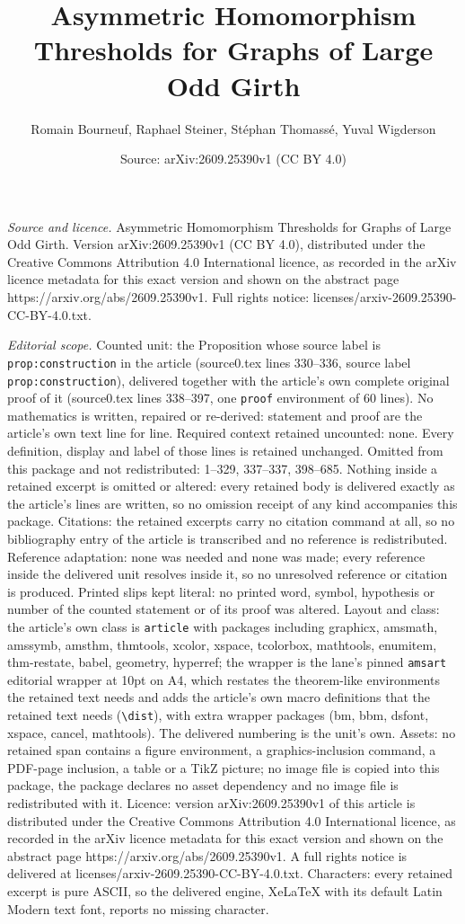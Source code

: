 \documentclass[10pt,a4paper]{amsart}
\title[Asymmetric Homomorphism Thresholds for Graphs of Large Odd G]{Asymmetric Homomorphism Thresholds for Graphs of Large Odd Girth}
\author{Romain Bourneuf, Raphael Steiner, St\'ephan Thomass\'e, Yuval Wigderson}
\date{Source: arXiv:2609.25390v1 (CC BY 4.0)}
\begin{document}
\maketitle

\noindent\emph{Source and licence.} Asymmetric Homomorphism Thresholds for Graphs of Large Odd Girth. Version arXiv:2609.25390v1 (CC BY 4.0), distributed under the Creative Commons Attribution 4.0 International licence, as recorded in the arXiv licence metadata for this exact version and shown on the abstract page https://arxiv.org/abs/2609.25390v1. Full rights notice: licenses/arxiv-2609.25390-CC-BY-4.0.txt.\par\smallskip

\noindent\textit{Editorial scope.} Counted unit: the Proposition whose source label is \texttt{prop:construction} in the article (source0.tex lines 330--336, source label \texttt{prop:construction}), delivered together with the article's own complete original proof of it (source0.tex lines 338--397, one \texttt{proof} environment of 60 lines). No mathematics is written, repaired or re-derived: statement and proof are the article's own text line for line. Required context retained uncounted: none. Every definition, display and label of those lines is retained unchanged. Omitted from this package and not redistributed: 1--329, 337--337, 398--685. Nothing inside a retained excerpt is omitted or altered: every retained body is delivered exactly as the article's lines are written, so no omission receipt of any kind accompanies this package. Citations: the retained excerpts carry no citation command at all, so no bibliography entry of the article is transcribed and no reference is redistributed. Reference adaptation: none was needed and none was made; every reference inside the delivered unit resolves inside it, so no unresolved reference or citation is produced. Printed slips kept literal: no printed word, symbol, hypothesis or number of the counted statement or of its proof was altered. Layout and class: the article's own class is \texttt{article} with packages including graphicx, amsmath, amssymb, amsthm, thmtools, xcolor, xspace, tcolorbox, mathtools, enumitem, thm-restate, babel, geometry, hyperref; the wrapper is the lane's pinned \texttt{amsart} editorial wrapper at 10pt on A4, which restates the theorem-like environments the retained text needs and adds the article's own macro definitions that the retained text needs (\texttt{\textbackslash dist}), with extra wrapper packages (bm, bbm, dsfont, xspace, cancel, mathtools). The delivered numbering is the unit's own. Assets: no retained span contains a figure environment, a graphics-inclusion command, a PDF-page inclusion, a table or a TikZ picture; no image file is copied into this package, the package declares no asset dependency and no image file is redistributed with it. Licence: version arXiv:2609.25390v1 of this article is distributed under the Creative Commons Attribution 4.0 International licence, as recorded in the arXiv licence metadata for this exact version and shown on the abstract page https://arxiv.org/abs/2609.25390v1. A full rights notice is delivered at licenses/arxiv-2609.25390-CC-BY-4.0.txt. Characters: every retained excerpt is pure ASCII, so the delivered engine, XeLaTeX with its default Latin Modern text font, reports no missing character.
\end{document}
